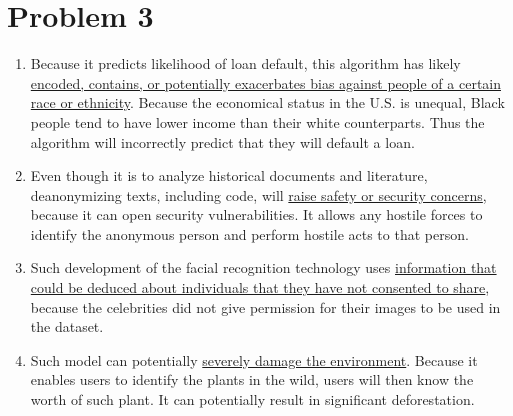 \documentclass[12pt]{article}
\begin{document}
\section*{Problem 3}

\begin{enumerate}[label=(\alph*)]
\item
Because it predicts likelihood of loan default, this algorithm has likely \ul{encoded, contains, or potentially exacerbates bias against people of a certain race or ethnicity}. Because the economical status in the U.S. is unequal, Black people tend to have lower income than their white counterparts. Thus the algorithm will incorrectly predict that they will default a loan.

\item
Even though it is to analyze historical documents and literature, deanonymizing texts, including code, will \ul{raise safety or security concerns}, because it can open security vulnerabilities. It allows any hostile forces to identify the anonymous person and perform hostile acts to that person.

\item
Such development of the facial recognition technology uses \ul{information that could be deduced about individuals that they have not consented to share}, because the celebrities did not give permission for their images to be used in the dataset.

\item
Such model can potentially \ul{severely damage the environment}. Because it enables users to identify the plants in the wild, users will then know the worth of such plant. It can potentially result in significant deforestation.

\end{enumerate}
\end{document}
